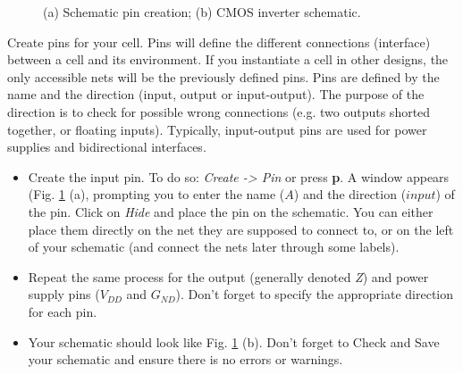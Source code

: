 \begin{enumerate}
{\begin{figure}
			\caption{(a) Schematic pin creation; (b) CMOS inverter schematic.}
			\label{fig_pin}
		\end{figure}
		\item Create pins for your cell. Pins will define the different connections (interface) between a cell and its environment. If you instantiate a cell in other designs, the only accessible nets will be the previously defined pins. Pins are defined by the name and the direction (input, output or input-output). The purpose of the direction is to check for possible wrong connections (e.g. two outputs shorted together, or floating inputs). Typically, input-output pins are used for power supplies and bidirectional interfaces.
		
		\begin{itemize}
			\item Create the input pin. To do so: \textit{Create -> Pin} or press \textbf{p}. A window appears (Fig. \ref{fig_pin} (a), prompting you to enter the name ($A$) and the direction ($input$) of the pin. Click on \textit{Hide} and place the pin on the schematic. You can either place them directly on the net they are supposed to connect to, or on the left of your schematic (and connect the nets later through some labels).	
			\item Repeat the same process for the output (generally denoted \textit{Z}) and power supply pins ($V_{DD}$ and $G_{ND}$). Don't forget to specify the appropriate direction for each pin.
			\item Your schematic should look like Fig. \ref{fig_pin} (b). Don't forget to Check and Save your schematic and ensure there is no errors or warnings.
	\end{itemize}}
	

\end{enumerate}
